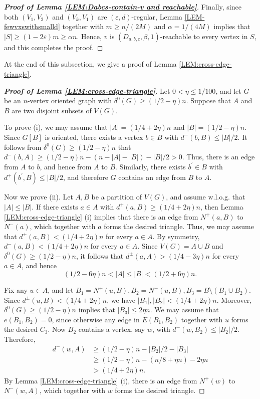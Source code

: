 \documentclass[11pt,a4paper,reqno]{amsart}
\theoremstyle{definition} %
\begin{document}
\begin{proof}[\textbf{Proof of Lemma \ref{LEM:Dabcs-contain-v and reachable}}]
Finally, since both $(V_1,V_2)$ and $(V_k,V_1)$ are $(\varepsilon,d)$-regular, Lemma \ref{LEM-fewvxswithsmalld} together with $m\geqslant n/(2M)$ and $\alpha=1/(4M)$ implies that $
|S|\geqslant (1-2\varepsilon)m\geqslant \alpha n$.  
Hence, $v$ is $(D_{a,b,c},\beta,1)$-reachable to every vertex in $S$, and this  completes the proof.
\end{proof}
At the end of this subsection, we give a proof of Lemma \ref{LEM:cross-edge-triangle}.
\begin{proof}[\textbf{Proof of Lemma \ref{LEM:cross-edge-triangle}}] 
Let $0<\eta\leqslant 1/100$, and let $G$ be an $n$-vertex oriented graph with $\delta^{0}(G)\geqslant (1/2-\eta)n$. Suppose that $A$ and $B$ are two disjoint subsets of $V(G)$.

To prove (i), we may assume that $|A|=(1/4+2\eta)n$ and $|B|=(1/2-\eta)n$. Since $G[B]$ is oriented, there exists a vertex $b\in B$ with $d^-(b,B)\leqslant |B|/2$. It follows from $\delta^0(G)\geqslant (1/2-\eta)n$ that $d^-(b,A)\geqslant (1/2-\eta)n-(n-|A|-|B|)-|B|/2>0$. 
Thus, there is an edge from $A$ to $b$, and hence from $A$ to $B$. Similarly, there exists  $b^\prime\in B$ with $d^+(b^\prime,B)\leqslant |B|/2$, and therefore $G$ contains an edge from $B$ to $A$.

Now we prove (ii). Let $A,B$ be a partition of $V(G)$, and assume w.l.o.g. that $|A|\leqslant |B|$. If there exists  $a\in A$ with $d^+(a,B)\geqslant (1/4+2\eta)n$, then Lemma \ref{LEM:cross-edge-triangle} (i) implies that there is an edge from $N^+(a,B)$ to $N^-(a)$, which together with $a$ forms the desired triangle. Thus, we may assume that $d^+(a,B)<(1/4+2\eta)n$ for every $a\in A$. 
By symmetry, $d^-(a,B)<(1/4+2\eta)n$ for every $a\in A$. 
Since $V(G)=A\cup B$ and $\delta^0(G)\geqslant (1/2-\eta)n$, it follows that $d^\pm(a,A)>(1/4-3\eta)n$ for every $a\in A$, and hence
$$
(1/2-6\eta)n<|A|\leqslant |B|<(1/2+6\eta)n.
$$

Fix any $u\in A$, and let $B_1=N^+(u,B), B_2=N^-(u,B), B_3=B\setminus(B_1\cup B_2)$. 
Since $d^\pm(u,B)<(1/4+2\eta)n$, we have $|B_1|,|B_2|<(1/4+2\eta)n$. Moreover, $\delta^0(G)\geqslant (1/2-\eta)n$ implies that $|B_3|\leqslant 2\eta n$. We may assume that $e(B_1,B_2)=0$, since otherwise any edge in $E(B_1,B_2)$ together with $u$ forms the desired $C_3$. Now $B_2$ contains a vertex, say $w$, with $d^{-}(w,B_2)\leqslant |B_2|/2$. Therefore,
\begin{align*}
d^{-}(w,A)
&\geqslant (1/2-\eta)n-|B_2|/2-|B_3|\\
&\geqslant (1/2-\eta)n-(n/8+\eta n)-2\eta n\\
&>(1/4+2\eta)n.
\end{align*}
By Lemma \ref{LEM:cross-edge-triangle} (i), there is an edge from $N^+(w)$ to $N^-(w,A)$, which together with $w$ forms the desired triangle. 
\end{proof}
\end{document}
